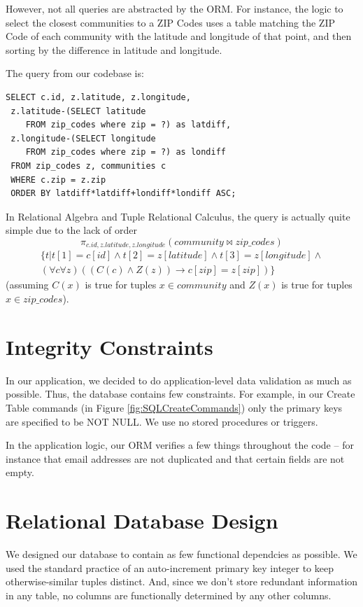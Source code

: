 \documentclass{acm_proc_article-sp}
\begin{document}
However, not all queries are abstracted by the ORM. For instance, the logic to select the closest
communities to a ZIP Codes uses a table matching the ZIP Code of each community with the latitude and
longitude of that point, and then sorting by the difference in latitude and longitude.

The query from our codebase is:
\begin{lstlisting}
SELECT c.id, z.latitude, z.longitude, 
 z.latitude-(SELECT latitude 
    FROM zip_codes where zip = ?) as latdiff, 
 z.longitude-(SELECT longitude 
    FROM zip_codes where zip = ?) as londiff 
 FROM zip_codes z, communities c 
 WHERE c.zip = z.zip 
 ORDER BY latdiff*latdiff+londiff*londiff ASC;
\end{lstlisting}

In Relational Algebra and Tuple Relational Calculus, the query is actually quite simple due to the lack of order
\[ \pi_{c.id,z.latitude,z.longitude}(\textit{community}\bowtie\textit{zip\_codes}) \]
\[ 
\begin{split}\{ t | t[1] = c[id] \land t[2] = z[latitude] \land t[3] = z[longitude] \land \\
(\forall c\forall z)((C(c) \land Z(z)) \to c[zip] = z[zip])
\}
\end{split}
\]
(assuming $C(x)$ is true for tuples $x \in \textit{community}$ and $Z(x)$ is true for tuples $x \in \textit{zip\_codes}$).

\section{Integrity Constraints}
In our application, we decided to do application-level data validation as much as possible. Thus, the database
contains few constraints. For example, in our Create Table commands (in Figure \ref{fig:SQLCreateCommands}) only
the primary keys are specified to be NOT NULL. We use no stored procedures or triggers.

In the application logic, our ORM verifies a few things throughout the code -- for instance that email addresses 
are not duplicated and that certain fields are not empty.

\section{Relational Database Design}
We designed our database to contain as few functional dependcies as possible. We used the standard practice of an
auto-increment primary key integer to keep otherwise-similar tuples distinct. And, since we don't store redundant information
in any table, no columns are functionally determined by any other columns.
\end{document}
